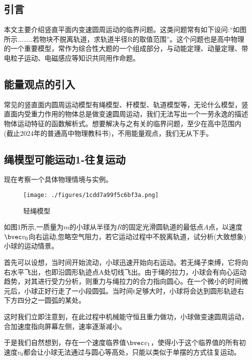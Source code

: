 

\begin{issues}
\issueDraft
\issueTODO
\end{issues}

\subsection{引言}
本文主要介绍竖直平面内变速圆周运动的临界问题。这类问题常有如下设问:“如图所示........若物块不脱离轨道，求轨道半径R的取值范围”。这个问题也是高中物理的一个重要模型，常作为综合性大题的一个组成部分，与动能定理、动量定理、带电粒子运动、电磁感应等知识共同用作命题。

\subsection{能量观点的引入}
常见的竖直面内圆周运动模型有绳模型、杆模型、轨道模型等，无论什么模型，竖直面内受重力作用的物体总是做变速圆周运动，我们无法写出一个一劳永逸的描述物体运动特征的函数解析式。想要解决与之有关的临界问题，至少在高中范围内(截止2024年的普通高中物理教科书)，不用能量观点，我们无从下手。

\subsection{绳模型可能运动1-往复运动}
现在考察一个具体物理情境与实例。
\begin{figure}[ht]
\centering
\texttt{[image: ./figures/1cdd7a99f5c6bf3a.png]}
\caption{轻绳模型} \label{fig_CirVer_1}
\end{figure}
如图1所示,一质量为$m$的小球从半径为$R$的固定光滑圆轨道的最低点$A$点，以速度$\bvec v_0$向右运动,忽略空气阻力，若它运动过程中不脱离轨道，试分析(大致想象)小球的运动情景。

首先可以设想，当时间开始流动，小球迅速开始向右运动。若无绳子束缚，它将向右水平飞出，也即沿圆形轨迹点A处切线飞出。由于绳的拉力，小球会有向心运动趋势，对其进行受力分析，则重力与绳拉力的合力指向圆心。在一个微小的时间微元后，小球正好行走了一小段圆弧。当时间t足够大时，小球将会达到圆形轨迹右下方四分之一圆弧的某处。

这时我们立即注意到，在此过程中机械能守恒且重力做功，小球做变速圆周运动，合加速度指向屏幕左侧，速率逐渐减小。

于是我们自然想到，存在一个速度临界值$\bvec v_1$，使得小于这个临界值的所有初速度$v_0$都会让小球无法通过与圆心等高处，只能以类似于单摆的方式往复运动。


